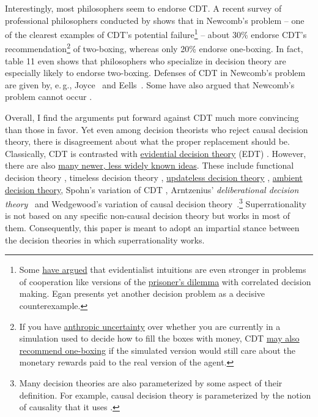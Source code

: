 Interestingly,
most philosophers seem to endorse CDT. A
recent survey of
professional philosophers conducted by \citet{Bourget2014-fm} shows that
in Newcomb's problem -- one of the clearest examples of CDT's potential
failure\footnote{Some
  \href{https://sl4librarian.files.wordpress.com/2016/12/newcomb-hurley.pdf}{have
  argued} that evidentialist intuitions are even stronger in problems
  of cooperation like versions of the
  \href{https://en.wikipedia.org/wiki/Prisoner\%27s_dilemma}{prisoner's
  dilemma} with correlated decision making.
  Egan \citeyear{Egan2007-ey} presents yet another decision
  problem as a decisive counterexample.} -- about 30\% endorse CDT's
recommendation\footnote{If you have
  \href{http://www.anthropic-principle.com/?q=book/table_of_contents}{anthropic
  uncertainty} over whether you are currently in a simulation used to
  decide how to fill the boxes with money, CDT
  \href{http://lesswrong.com/lw/asi/anthropic_reasoning_by_cdt_in_newcombs_problem/}{may
  also} \href{http://www.scottaaronson.com/blog/?p=30}{recommend
  one-boxing} if the simulated version would still care about the
  monetary rewards paid to the real version of the agent.} of
two-boxing, whereas only 20\% endorse one-boxing. In fact, table 11 even shows that philosophers who specialize in decision
theory are especially likely to endorse two-boxing. Defenses of CDT in Newcomb's
problem are given by, e.\,g., Joyce~\citeyear{Joyce1999-iv} and
Eells~\citeyear{Eells2016-ym}. Some have also argued that
Newcomb's problem cannot occur
\parencite{Binmore2007-uc,Ledwig2000-vp}.

Overall, I find the arguments put forward against CDT much more
convincing than those in favor. Yet even among decision theorists who
reject causal decision theory, there is disagreement about what the
proper replacement should be. Classically, CDT is contrasted with
\href{https://en.wikipedia.org/wiki/Evidential_decision_theory}{evidential
decision theory} (EDT)
\parencite{Ahmed2014-ec,Almond2010-xn,Price1986-qs,Horgan1981-hb}.
However, there are also
\href{https://casparoesterheld.com/a-comprehensive-list-of-decision-theories/}{many
newer, less widely known ideas}. These include functional decision
theory \parencite{Soares_undated-aj}, timeless decision
theory \parencite{Yudkowsky2010-ul},
\href{https://wiki.lesswrong.com/wiki/Updateless_decision_theory}{updateless
decision theory}
\parencite{Benson-Tilsen2014-cv,Hintze2014-xs,McAllister_undated-ms},
\href{https://wiki.lesswrong.com/wiki/Ambient_decision_theory}{ambient
decision theory}, Spohn's variation of CDT
\parencite{Spohn2003-zf,Spohn2005-tm,Spohn2012-fo},
Arntzenius' \emph{deliberational decision theory}~\citeyear{Arntzenius2008-wh} and
Wedgewood's variation of causal decision theory~\citeyear{Wedgwood2013-mt}.\footnote{Many decision
  theories are also parameterized by some aspect of their definition.
  For example, causal decision theory is parameterized by the notion of
  causality that it uses
  \parencite{Lewis1981-ct,Hajek2006-me,Weirich2016-gq,Pearl2009-xn}.}
Superrationality is not based on any specific non-causal decision theory
but works in most of them. Consequently, this paper is meant to adopt an
impartial stance between the decision theories in which superrationality
works.

